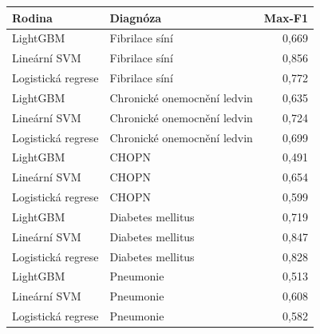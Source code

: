 \begin{tabular}{llr}
\toprule
Rodina & Diagnóza & Max-F1\\
\midrule
LightGBM & Fibrilace síní & 0,669\\
Lineární SVM & Fibrilace síní & 0,856\\
Logistická regrese & Fibrilace síní & 0,772\\
LightGBM & Chronické onemocnění ledvin & 0,635\\
Lineární SVM & Chronické onemocnění ledvin & 0,724\\
Logistická regrese & Chronické onemocnění ledvin & 0,699\\
LightGBM & CHOPN & 0,491\\
Lineární SVM & CHOPN & 0,654\\
Logistická regrese & CHOPN & 0,599\\
LightGBM & Diabetes mellitus & 0,719\\
Lineární SVM & Diabetes mellitus & 0,847\\
Logistická regrese & Diabetes mellitus & 0,828\\
LightGBM & Pneumonie & 0,513\\
Lineární SVM & Pneumonie & 0,608\\
Logistická regrese & Pneumonie & 0,582\\
\bottomrule
\end{tabular}
